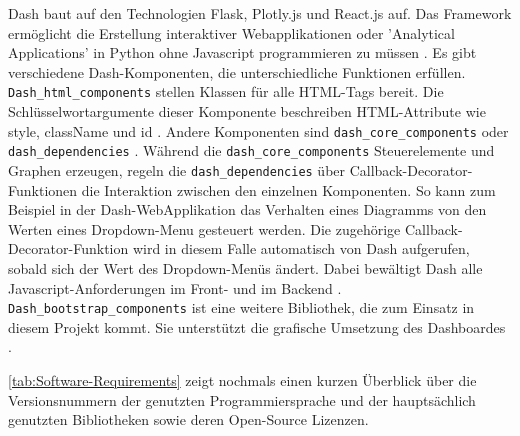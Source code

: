     Dash baut auf den Technologien Flask, Plotly.js und React.js auf. Das Framework ermöglicht die Erstellung interaktiver Webapplikationen 
    oder 'Analytical Applications' in Python ohne Javascript programmieren zu müssen \cite[vgl.][]{plotly_dash_2021}.
    Es gibt verschiedene Dash-Komponenten, die unterschiedliche Funktionen erfüllen. \texttt{Dash\_html\_components} stellen Klassen für alle HTML-Tags bereit.
    Die Schlüsselwortargumente dieser Komponente beschreiben HTML-Attribute wie style, className und id \cite[vgl.][]{plotly_dash_2021-2}. 
    Andere Komponenten sind \texttt{dash\_core\_components} oder \texttt{dash\_dependencies} \cite[vgl.][]{plotly_dash_2021-1}. Während die \texttt{dash\_core\_components}
    Steuerelemente und Graphen erzeugen, regeln die \texttt{dash\_dependencies} über Callback-Decorator-Funktionen die Interaktion zwischen den einzelnen Komponenten.
    So kann zum Beispiel in der Dash-WebApplikation das Verhalten eines Diagramms von den Werten eines Dropdown-Menu gesteuert werden. 
    Die zugehörige Callback-Decorator-Funktion wird in diesem Falle automatisch von Dash aufgerufen, sobald sich der Wert des Dropdown-Menüs ändert. 
    Dabei bewältigt Dash alle Javascript-Anforderungen im Front- und im Backend \cite[vgl.][]{plotly_dash_2021-3}.
    \texttt{Dash\_bootstrap\_components} ist eine weitere Bibliothek, die zum Einsatz in diesem Projekt kommt. Sie unterstützt die grafische Umsetzung
    des Dashboardes \cite[vgl.][]{faculty_dash_2021}.

    \autoref{tab:Software-Requirements} zeigt nochmals einen 
    kurzen Überblick über die Versionsnummern der genutzten Programmiersprache und der hauptsächlich genutzten Bibliotheken sowie deren Open-Source
    Lizenzen.
    
